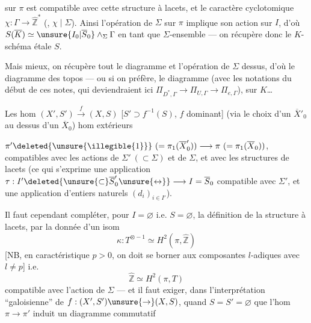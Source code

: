 
   sur $\pi$ est
compatible avec cette structure à lacets,
et le caractère cyclotomique $\chi:\Gamma\to\widehat{\mathbb Z}^{*}$
(, $\chi\mid\Sigma$). Ainsi l'opération de
$\Sigma$ sur $\pi$ implique son action sur $I$, d'où
$S(\overline K)\simeq\unsure{I_0|\overline S_0}\wedge_{\Sigma}\Gamma$ en tant que $\Sigma$-ensemble
--- on récupère donc le $K$-schéma étale $S$.

Mais mieux, on récupère tout le
diagramme
et l'opération de $\Sigma$ dessus, d'où le
diagramme des topos  --- ou si
on préfère, le diagramme
(avec les notations du début de ces notes,
qui deviendraient ici $\Pi_{D^{*},\Gamma}\to\Pi_{U,\Gamma}\to\Pi_{e,\Gamma}$),
  sur $K$\dots

Les hom $(X',S')\xrightarrow{f}(X,S)$
[$S'\supset f^{-1}(S)$, $f$ dominant]  
  (via le choix d'un $\overline X'_0$
au dessus d'un $\overline X_0$)   hom extérieurs



$\pi'\deleted{\unsure{\illegible{1}}}\ (=\pi_1(\overline X'_0))\longrightarrow\pi\ (=\pi_1(\overline X_0))$, compatibles
avec les actions de $\Sigma'\ (\subset\Sigma)$ et de $\Sigma$,
et avec les structures de lacets 
(ce qui s'exprime   une application
$\tau:I'\deleted{\unsure{\subset}\overline S'_0\unsure{\leftrightarrow}}\longrightarrow I=\overline S_0$ compatible avec
$\Sigma'$, et une application d'entiers naturels
$(d_i)_{i\in I'}$).

Il faut cependant compléter,  pour
$I=\varnothing$ i.e. $S=\varnothing$, la définition de la
structure à lacets, par la donnée d'un
isom
\[
\kappa:T^{\otimes-1}\simeq H^2(\pi,\widehat{\mathbb Z})
\]
[NB, en caractéristique $p>0$, on doit se borner
aux composantes $l$-adiques avec $l\ne p$]
i.e.
\[
\widehat{\mathbb Z}\simeq H^2(\pi,T)
\]
compatible avec l'action de $\Sigma$
--- et il faut exiger, dans l'interprétation
``galoisienne'' de $f:(X',S')\unsure{\to}(X,S)$, quand $S=S'=\varnothing$
que l'hom $\pi\to\pi'$ induit un
diagramme commutatif

